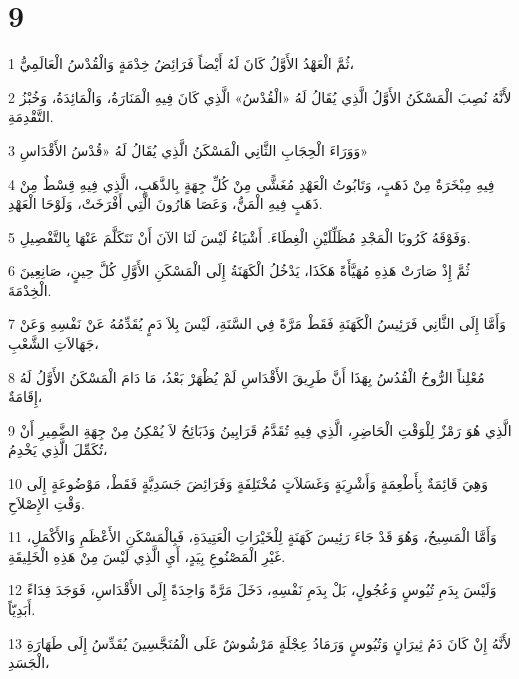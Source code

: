 \chapter{9}

\par 1 ثُمَّ الْعَهْدُ الأَوَّلُ كَانَ لَهُ أَيْضاً فَرَائِضُ خِدْمَةٍ وَالْقُدْسُ الْعَالَمِيُّ،
\par 2 لأَنَّهُ نُصِبَ الْمَسْكَنُ الأَوَّلُ الَّذِي يُقَالُ لَهُ «الْقُدْسُ» الَّذِي كَانَ فِيهِ الْمَنَارَةُ، وَالْمَائِدَةُ، وَخُبْزُ التَّقْدِمَةِ.
\par 3 وَوَرَاءَ الْحِجَابِ الثَّانِي الْمَسْكَنُ الَّذِي يُقَالُ لَهُ «قُدْسُ الأَقْدَاسِ»
\par 4 فِيهِ مِبْخَرَةٌ مِنْ ذَهَبٍ، وَتَابُوتُ الْعَهْدِ مُغَشًّى مِنْ كُلِّ جِهَةٍ بِالذَّهَبِ، الَّذِي فِيهِ قِسْطٌ مِنْ ذَهَبٍ فِيهِ الْمَنُّ، وَعَصَا هَارُونَ الَّتِي أَفْرَخَتْ، وَلَوْحَا الْعَهْدِ.
\par 5 وَفَوْقَهُ كَرُوبَا الْمَجْدِ مُظَلِّلَيْنِ الْغِطَاءَ. أَشْيَاءُ لَيْسَ لَنَا الآنَ أَنْ نَتَكَلَّمَ عَنْهَا بِالتَّفْصِيلِ.
\par 6 ثُمَّ إِذْ صَارَتْ هَذِهِ مُهَيَّأَةً هَكَذَا، يَدْخُلُ الْكَهَنَةُ إِلَى الْمَسْكَنِ الأَوَّلِ كُلَّ حِينٍ، صَانِعِينَ الْخِدْمَةَ.
\par 7 وَأَمَّا إِلَى الثَّانِي فَرَئِيسُ الْكَهَنَةِ فَقَطْ مَرَّةً فِي السَّنَةِ، لَيْسَ بِلاَ دَمٍ يُقَدِّمُهُ عَنْ نَفْسِهِ وَعَنْ جَهَالاَتِ الشَّعْبِ،
\par 8 مُعْلِناً الرُّوحُ الْقُدُسُ بِهَذَا أَنَّ طَرِيقَ الأَقْدَاسِ لَمْ يُظْهَرْ بَعْدُ، مَا دَامَ الْمَسْكَنُ الأَوَّلُ لَهُ إِقَامَةٌ،
\par 9 الَّذِي هُوَ رَمْزٌ لِلْوَقْتِ الْحَاضِرِ، الَّذِي فِيهِ تُقَدَّمُ قَرَابِينُ وَذَبَائِحُ لاَ يُمْكِنُ مِنْ جِهَةِ الضَّمِيرِ أَنْ تُكَمِّلَ الَّذِي يَخْدِمُ،
\par 10 وَهِيَ قَائِمَةٌ بِأَطْعِمَةٍ وَأَشْرِبَةٍ وَغَسَلاَتٍ مُخْتَلِفَةٍ وَفَرَائِضَ جَسَدِيَّةٍ فَقَطْ، مَوْضُوعَةٍ إِلَى وَقْتِ الإِصْلاَحِ.
\par 11 وَأَمَّا الْمَسِيحُ، وَهُوَ قَدْ جَاءَ رَئِيسَ كَهَنَةٍ لِلْخَيْرَاتِ الْعَتِيدَةِ، فَبِالْمَسْكَنِ الأَعْظَمِ وَالأَكْمَلِ، غَيْرِ الْمَصْنُوعِ بِيَدٍ، أَيِ الَّذِي لَيْسَ مِنْ هَذِهِ الْخَلِيقَةِ.
\par 12 وَلَيْسَ بِدَمِ تُيُوسٍ وَعُجُولٍ، بَلْ بِدَمِ نَفْسِهِ، دَخَلَ مَرَّةً وَاحِدَةً إِلَى الأَقْدَاسِ، فَوَجَدَ فِدَاءً أَبَدِيّاً.
\par 13 لأَنَّهُ إِنْ كَانَ دَمُ ثِيرَانٍ وَتُيُوسٍ وَرَمَادُ عِجْلَةٍ مَرْشُوشٌ عَلَى الْمُنَجَّسِينَ يُقَدِّسُ إِلَى طَهَارَةِ الْجَسَدِ،
